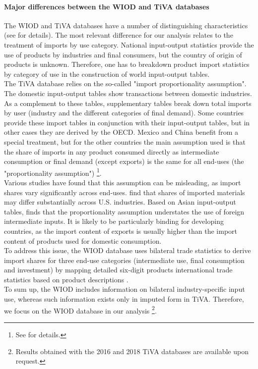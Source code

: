 \documentclass[11pt,a4paper]{article}
\begin{document}
\paragraph{Major differences between the WIOD and TiVA databases}
The WIOD and TiVA databases have a number of distinguishing characteristics (see \cite{Timmer2015} for details). The most relevant difference for our analysis relates to the treatment of imports by use category. National input-output statistics provide the use of products by industries and final consumers, but the country of origin of products is unknown. Therefore, one has to breakdown product import statistics by category of use in the construction of world input-output tables.\\
The TiVA database relies on the so-called "import proportionality assumption". The domestic input-output tables show transactions between domestic industries. As a complement to these tables, supplementary tables break down total imports by user (industry and the different categories of final demand). Some countries provide these import tables in conjunction with their input-output tables, but in other cases they are derived by the OECD. Mexico and China benefit from a special treatment, but for the other countries the main assumption used is that the share of imports in any product consumed directly as intermediate consumption or final demand (except exports) is the same for all end-uses (the "proportionality assumption") \footnote{See \cite{OECD2011} for details.}.\\
Various studies have found that this assumption can be misleading, as import shares vary significantly across end-uses. \cite{Feenstra2012} find that shares of imported materials may differ substantially across U.S. industries. Based on Asian input-output tables, \cite{Puzzello2012} finds that the proportionality assumption understates the use of foreign intermediate inputs. It is likely to be particularly binding for developing countries, as the import content of exports is usually higher than the import content of products used for domestic consumption.\\
To address this issue, the WIOD database uses bilateral trade statistics to derive import shares for three end-use categories (intermediate use, final consumption and investment) by mapping detailed six-digit products international trade statistics based on product descriptions \citep{Dietzenbacher2013}.\\
To sum up, the WIOD includes information on bilateral industry-specific input use, whereas such information exists only in imputed form in TiVA. Therefore, we focus on the WIOD database in our analysis \footnote{Results obtained with the 2016 and 2018 TiVA databases are available upon request.}. 
\end{document}
